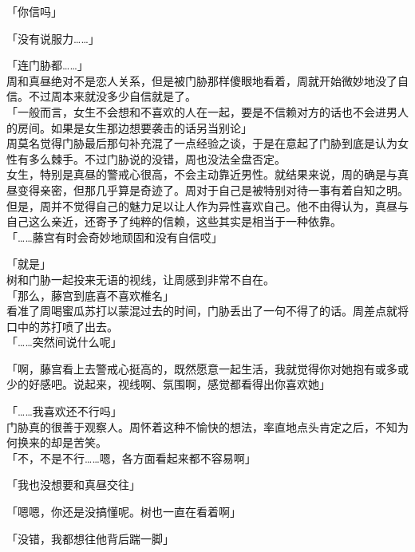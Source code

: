 「你信吗」

「没有说服力……」

「连门胁都……」\\

周和真昼绝对不是恋人关系，但是被门胁那样傻眼地看着，周就开始微妙地没了自信。不过周本来就没多少自信就是了。\\

「一般而言，女生不会想和不喜欢的人在一起，要是不信赖对方的话也不会进男人的房间。如果是女生那边想要袭击的话另当别论」\\

周莫名觉得门胁最后那句补充混了一点经验之谈，于是在意起了门胁到底是认为女性有多么棘手。不过门胁说的没错，周也没法全盘否定。\\

女生，特别是真昼的警戒心很高，不会主动靠近男性。就结果来说，周的确是与真昼变得亲密，但那几乎算是奇迹了。周对于自己是被特别对待一事有着自知之明。\\

但是，周并不觉得自己的魅力足以让人作为异性喜欢自己。他不由得认为，真昼与自己这么亲近，还寄予了纯粹的信赖，这些其实是相当于一种依靠。\\

「……藤宫有时会奇妙地顽固和没有自信哎」

「就是」\\

树和门胁一起投来无语的视线，让周感到非常不自在。\\

「那么，藤宫到底喜不喜欢椎名」\\

看准了周喝蜜瓜苏打以蒙混过去的时间，门胁丢出了一句不得了的话。周差点就将口中的苏打喷了出去。\\

「……突然间说什么呢」

「啊，藤宫看上去警戒心挺高的，既然愿意一起生活，我就觉得你对她抱有或多或少的好感吧。说起来，视线啊、氛围啊，感觉都看得出你喜欢她」

「……我喜欢还不行吗」\\

门胁真的很善于观察人。周怀着这种不愉快的想法，率直地点头肯定之后，不知为何换来的却是苦笑。\\

「不，不是不行……嗯，各方面看起来都不容易啊」

「我也没想要和真昼交往」

「嗯嗯，你还是没搞懂呢。树也一直在看着啊」

「没错，我都想往他背后踹一脚」

